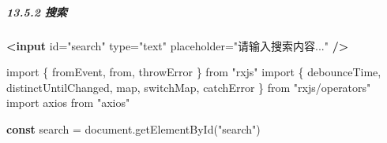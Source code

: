 \documentclass[
]{article}
\newenvironment{Shaded}{}{}
\newcommand{\BuiltInTok}[1]{#1}
\newcommand{\FunctionTok}[1]{\textcolor[rgb]{0.02,0.16,0.49}{#1}}
\newcommand{\ImportTok}[1]{#1}
\newcommand{\KeywordTok}[1]{\textcolor[rgb]{0.00,0.44,0.13}{\textbf{#1}}}
\newcommand{\NormalTok}[1]{#1}
\newcommand{\OperatorTok}[1]{\textcolor[rgb]{0.40,0.40,0.40}{#1}}
\newcommand{\OtherTok}[1]{\textcolor[rgb]{0.00,0.44,0.13}{#1}}
\newcommand{\StringTok}[1]{\textcolor[rgb]{0.25,0.44,0.63}{#1}}
\begin{document}
\hypertarget{1352-ux641cux7d22}{%
\subparagraph{13.5.2 搜索}\label{1352-ux641cux7d22}}

\begin{Shaded}
\begin{Highlighting}[]
\KeywordTok{\textless{}input}\OtherTok{ id=}\StringTok{"search"}\OtherTok{ type=}\StringTok{"text"}\OtherTok{ placeholder=}\StringTok{"请输入搜索内容..."} \KeywordTok{/\textgreater{}}
\end{Highlighting}
\end{Shaded}

\begin{Shaded}
\begin{Highlighting}[]
\ImportTok{import}\NormalTok{ \{ fromEvent}\OperatorTok{,} \ImportTok{from}\OperatorTok{,}\NormalTok{ throwError \} }\ImportTok{from} \StringTok{"rxjs"}
\ImportTok{import}\NormalTok{ \{ debounceTime}\OperatorTok{,}\NormalTok{ distinctUntilChanged}\OperatorTok{,}\NormalTok{ map}\OperatorTok{,}\NormalTok{ switchMap}\OperatorTok{,}\NormalTok{ catchError \} }\ImportTok{from} \StringTok{"rxjs/operators"}
\ImportTok{import}\NormalTok{ axios }\ImportTok{from} \StringTok{"axios"}

\KeywordTok{const}\NormalTok{ search }\OperatorTok{=} \BuiltInTok{document}\OperatorTok{.}\FunctionTok{getElementById}\NormalTok{(}\StringTok{"search"}\NormalTok{)}


\end{Highlighting}
\end{Shaded}
\end{document}
